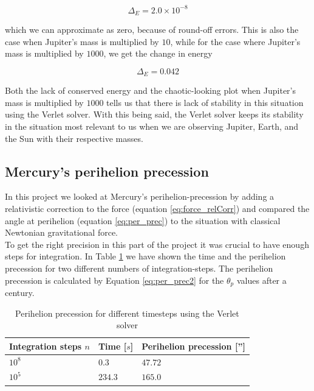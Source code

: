 \documentclass[%
 reprint,
 nobalance,
 amsmath,amssymb,
 aps,
]{revtex4-1}
\begin{document}
\begin{equation}
\Delta_{E} = 2.0\times 10^{-8}
\end{equation}

which we can approximate as zero, because of round-off errors. This is also the case when Jupiter's mass is multiplied by $10$, while for the case where Jupiter's mass is multiplied by $1000$, we get the change in energy

\begin{equation}
\Delta_{E} = 0.042
\end{equation}

Both the lack of conserved energy and the chaotic-looking plot when Jupiter's mass is multiplied by $1000$  tells us that there is lack of stability in this situation using the Verlet solver. With this being said, the Verlet solver keeps its stability in the situation most relevant to us when we are observing Jupiter, Earth, and the Sun with their respective masses. 

\subsection{\label{sec:Sub3}Mercury's perihelion precession}

In this project we looked at Mercury's perihelion-precession by adding a relativistic correction to the force (equation \eqref{eq:force_relCorr}) and compared the angle at perihelion (equation \eqref{eq:per_prec}) to the situation with classical Newtonian gravitational force.\\
To get the right precision in this part of the project it was crucial to have enough steps for integration. In Table \ref{table:perPrec} we have shown the time and the perihelion precession for two different numbers of integration-steps. The perihelion precession is calculated by Equation \eqref{eq:per_prec2} for the $\theta_p$ values after a century.

\begin{table}[h]
\centering
\caption{Perihelion precession for different timesteps using the Verlet solver}
\label{table:perPrec}
\begin{tabular}{|l|l|l|}
\hline
\textbf{Integration steps $n$} & \textbf{Time {[}$s${]}} & \textbf{Perihelion precession {[}''{]}} \\ \hline
$10^8$                 & $0.3$                   & $47.72$                                \\ \hline
$10^5$                 & $234.3$                 & $165.0$                                \\ \hline
\end{tabular}
\end{table}
\end{document}
